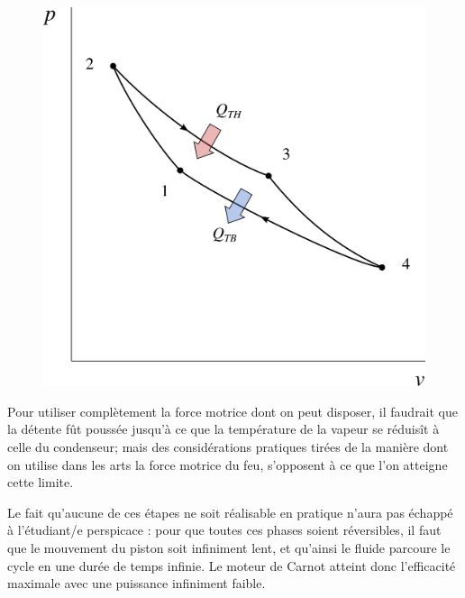 		\begin{figure}[htc]%
			\begin{center}
				\includegraphics[width=\didacticpvdiagramwidth]{images/carnot_pv_gp_moteur.png}
			\end{center}
			\label{fig_p-v_gp_carnot}
		\end{figure}

			Pour utiliser complètement la force motrice dont on peut disposer, il faudrait que la détente fût poussée jusqu’à ce que la température de la vapeur se réduisît à celle du condenseur; mais des considérations pratiques tirées de la manière dont on utilise dans les arts la force motrice du feu, s’opposent à ce que l’on atteigne cette limite.

		Le fait qu’aucune de ces étapes ne soit réalisable en pratique n’aura pas échappé à l’étudiant/e perspicace : pour que toutes ces phases soient réversibles, il faut que le mouvement du piston soit infiniment lent, et qu'ainsi le fluide parcoure le cycle en une durée de temps infinie. Le moteur de Carnot atteint donc l’efficacité maximale avec une puissance infiniment faible.
		
